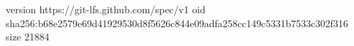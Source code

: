 version https://git-lfs.github.com/spec/v1
oid sha256:b68e2579e69d41929530d8f5626c844e09adfa258cc149c5331b7533c302f316
size 21884
